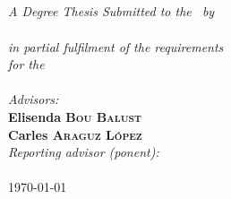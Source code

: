 \documentclass[
10pt, %
english, %
singlespacing, %
parskip, %
headsepline, %
]{MastersDoctoralThesis} %
\author{Santiago \textsc{Rodrigo Mu\~noz}} %
\begin{document}
\frontmatter %

\pagestyle{plain} %


\begin{titlepage}
\begin{center}

\textsc{\LARGE \univname}\\[1.5cm] %

\HRule \\[0.4cm] %
{\huge \bfseries \ttitle}\\[0.2cm] %
\HRule \\[3.5cm] %
 
\large \textit{A Degree Thesis Submitted to the \facname ~by}\\[0.2cm]

\Large \textbf{\authorname}\\[0.2cm]

\large \textit{in partial fulfilment of the requirements\\ for the}\\[0.5cm]

\Large \textbf{\degreename}\\[2.0cm] %

\emph{Advisors:} \\
\large \textbf{Elisenda \textsc{Bou Balust}}\\\textbf{Carles \textsc{Araguz L\'opez}}\\[1.0cm]

\Large \emph{Reporting advisor (ponent):} \\
\large \textbf{\supname}\\[1.0cm]
 
{\large \today}\\[2cm] %
 
\vfill
\end{center}
\end{titlepage}
\end{document}
